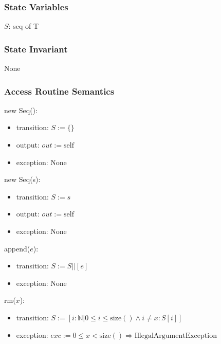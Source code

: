 \documentclass[12pt]{article}
\begin{document}
\subsubsection* {State Variables}

$S$: seq of T

\subsubsection* {State Invariant}

None

\subsubsection* {Access Routine Semantics}

new Seq():
\begin{itemize}
	\item transition: $S := \{\}$
	\item output: $out := \mbox{self}$
	\item exception: None
\end{itemize}

new Seq(s):
\begin{itemize}
	\item transition: $S := s$
	\item output: $out := \mbox{self}$
	\item exception: None
\end{itemize}

\noindent append($e$):
\begin{itemize}
	\item transition: $S := S || [ e ]$
	\item exception: None
\end{itemize}

\noindent rm($x$):
\begin{itemize}
	\item transition: $S := [i : \mathbb{N} | 0 \le i \le \mbox{size}() \land i \neq x : \textit{S}[i] ]$
	\item exception: $exc := 0 \le x < \mbox{size}() \Rightarrow \text{IllegalArgumentException}$
\end{itemize}

\end{document}
